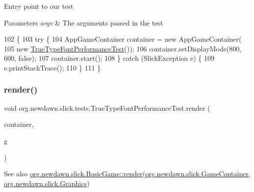 Entry point to our test


\begin{DoxyParams}{Parameters}
{\em argv} & The arguments passed in the test \\
\hline
\end{DoxyParams}

\begin{DoxyCode}
102                                            \{
103         \textcolor{keywordflow}{try} \{
104             AppGameContainer container = \textcolor{keyword}{new} AppGameContainer(
105                     \textcolor{keyword}{new} \mbox{\hyperlink{classorg_1_1newdawn_1_1slick_1_1tests_1_1_true_type_font_performance_test_abad65130b826467e018e29fecca8ced3}{TrueTypeFontPerformanceTest}}());
106             container.setDisplayMode(800, 600, \textcolor{keyword}{false});
107             container.start();
108         \} \textcolor{keywordflow}{catch} (SlickException e) \{
109             e.printStackTrace();
110         \}
111     \}
\end{DoxyCode}
\mbox{\label{classorg_1_1newdawn_1_1slick_1_1tests_1_1_true_type_font_performance_test_a6bc885506e3a3dc033a9333b303ec80e}} 
\subsubsection{\texorpdfstring{render()}{render()}}
{\footnotesize\ttfamily void org.\+newdawn.\+slick.\+tests.\+True\+Type\+Font\+Performance\+Test.\+render (\begin{DoxyParamCaption}\item[{\mbox{\hyperlink{classorg_1_1newdawn_1_1slick_1_1_game_container}{Game\+Container}}}]{container,  }\item[{\mbox{\hyperlink{classorg_1_1newdawn_1_1slick_1_1_graphics}{Graphics}}}]{g }\end{DoxyParamCaption})\hspace{0.3cm}{\ttfamily [inline]}}

\begin{DoxySeeAlso}{See also}
\mbox{\hyperlink{interfaceorg_1_1newdawn_1_1slick_1_1_game_af1a4670d43eb3ba04dfcf55ab1975b64}{org.\+newdawn.\+slick.\+Basic\+Game\+::render}}(\mbox{\hyperlink{classorg_1_1newdawn_1_1slick_1_1_game_container}{org.\+newdawn.\+slick.\+Game\+Container}}, \mbox{\hyperlink{classorg_1_1newdawn_1_1slick_1_1_graphics}{org.\+newdawn.\+slick.\+Graphics}}) 
\end{DoxySeeAlso}


